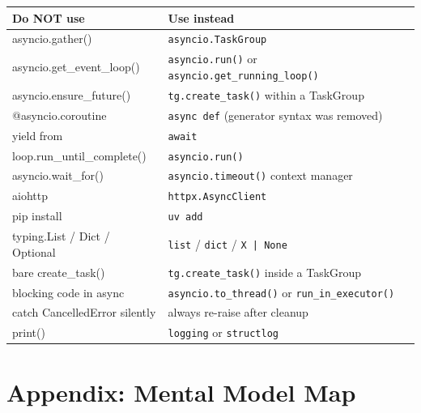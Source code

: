 \documentclass[11pt,a4paper,oneside]{book}
\newcommand{\py}[1]{\texttt{\color{pyblue}#1}}
\begin{document}
\begin{center}
\renewcommand{\arraystretch}{1.5}
\begin{tcolorbox}[
    colback=dangerbg,
    colframe=dangerborder,
    coltitle=white,
    colbacktitle=dangerborder,
    fonttitle=\bfseries\sffamily\large,
    title={Banned Patterns},
    arc=3pt,
    boxrule=1.5pt,
    width=0.98\textwidth,
]
\small
\begin{tabularx}{\textwidth}{>{\ttfamily\color{dangerborder}}p{4.5cm} X}
\toprule
\normalfont\textbf{Do NOT use} & \textbf{Use instead} \\
\midrule
asyncio.gather()           & \py{asyncio.TaskGroup} \\
asyncio.get\_event\_loop() & \py{asyncio.run()} or \py{asyncio.get\_running\_loop()} \\
asyncio.ensure\_future()   & \py{tg.create\_task()} within a TaskGroup \\
@asyncio.coroutine         & \py{async def} (generator syntax was removed) \\
yield from                 & \py{await} \\
loop.run\_until\_complete() & \py{asyncio.run()} \\
asyncio.wait\_for()        & \py{asyncio.timeout()} context manager \\
aiohttp                    & \py{httpx.AsyncClient} \\
pip install                & \py{uv add} \\
typing.List / Dict / Optional & \py{list} / \py{dict} / \py{X | None} \\
bare create\_task()         & \py{tg.create\_task()} inside a TaskGroup \\
blocking code in async     & \py{asyncio.to\_thread()} or \py{run\_in\_executor()} \\
catch CancelledError silently & always re-raise after cleanup \\
print()                    & \py{logging} or \py{structlog} \\
\bottomrule
\end{tabularx}
\end{tcolorbox}
\end{center}

\chapter*{Appendix: Mental Model Map}
\end{document}

